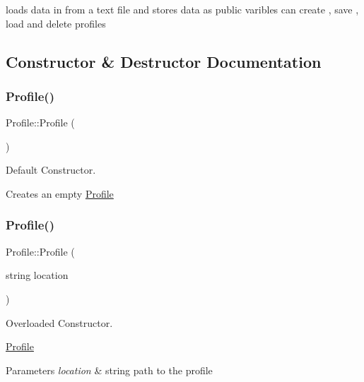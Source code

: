 loads data in from a text file and stores data as public varibles can create , save , load and delete profiles 

\subsection{Constructor \& Destructor Documentation}
\hypertarget{class_profile_a4eea708cdbed0262d9e7ddbe3f1e3f89}{}\label{class_profile_a4eea708cdbed0262d9e7ddbe3f1e3f89} 
\subsubsection{\texorpdfstring{Profile()}{Profile()}\hspace{0.1cm}{\footnotesize\ttfamily [1/3]}}
{\footnotesize\ttfamily Profile\+::\+Profile (\begin{DoxyParamCaption}{ }\end{DoxyParamCaption})}



Default Constructor. 

Creates an empty \hyperlink{class_profile}{Profile} \hypertarget{class_profile_a2f1ced1b7bf7fc6d54468f645ba9899c}{}\label{class_profile_a2f1ced1b7bf7fc6d54468f645ba9899c} 
\subsubsection{\texorpdfstring{Profile()}{Profile()}\hspace{0.1cm}{\footnotesize\ttfamily [2/3]}}
{\footnotesize\ttfamily Profile\+::\+Profile (\begin{DoxyParamCaption}\item[{string}]{location }\end{DoxyParamCaption})}



Overloaded Constructor. 

\hyperlink{class_profile}{Profile}


\begin{DoxyParams}{Parameters}
{\em location} & string path to the profile \\
\hline
\end{DoxyParams}
\hypertarget{class_profile_a69b3d3c58a1db8e6edeea0c48f40ab4b}{}\label{class_profile_a69b3d3c58a1db8e6edeea0c48f40ab4b} 
